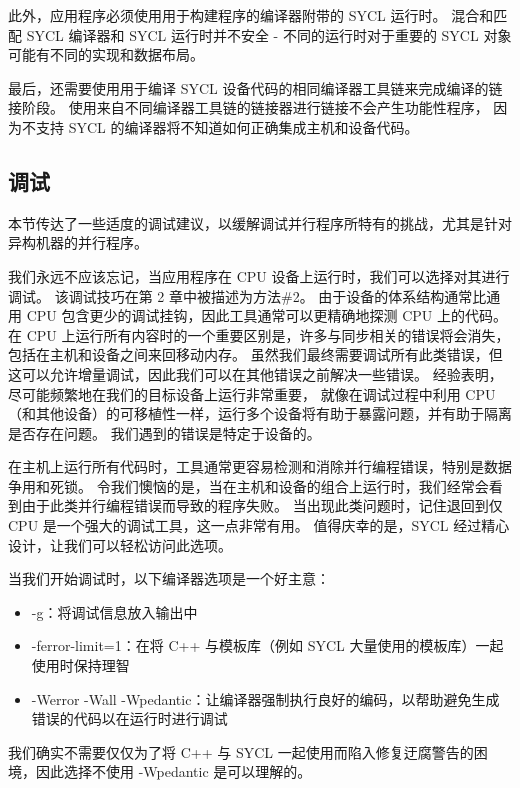 此外，应用程序必须使用用于构建程序的编译器附带的 SYCL 运行时。 
混合和匹配 SYCL 编译器和 SYCL 运行时并不安全 - 不同的运行时对于重要的 SYCL 对象可能有不同的实现和数据布局。

最后，还需要使用用于编译 SYCL 设备代码的相同编译器工具链来完成编译的链接阶段。 
使用来自不同编译器工具链的链接器进行链接不会产生功能性程序，
因为不支持 SYCL 的编译器将不知道如何正确集成主机和设备代码。

\subsection{调试}
本节传达了一些适度的调试建议，以缓解调试并行程序所特有的挑战，尤其是针对异构机器的并行程序。

我们永远不应该忘记，当应用程序在 CPU 设备上运行时，我们可以选择对其进行调试。 
该调试技巧在第 2 章中被描述为方法\#2。
由于设备的体系结构通常比通用 CPU 包含更少的调试挂钩，因此工具通常可以更精确地探测 CPU 上的代码。 
在 CPU 上运行所有内容时的一个重要区别是，许多与同步相关的错误将会消失，包括在主机和设备之间来回移动内存。 
虽然我们最终需要调试所有此类错误，但这可以允许增量调试，因此我们可以在其他错误之前解决一些错误。 
经验表明，尽可能频繁地在我们的目标设备上运行非常重要，
就像在调试过程中利用 CPU（和其他设备）的可移植性一样，运行多个设备将有助于暴露问题，并有助于隔离是否存在问题。 
我们遇到的错误是特定于设备的。

在主机上运行所有代码时，工具通常更容易检测和消除并行编程错误，特别是数据争用和死锁。 
令我们懊恼的是，当在主机和设备的组合上运行时，我们经常会看到由于此类并行编程错误而导致的程序失败。 
当出现此类问题时，记住退回到仅 CPU 是一个强大的调试工具，这一点非常有用。 
值得庆幸的是，SYCL 经过精心设计，让我们可以轻松访问此选项。

当我们开始调试时，以下编译器选项是一个好主意：

\begin{itemize}
	\item -g：将调试信息放入输出中

	\item -ferror-limit=1：在将 C++ 与模板库（例如 SYCL 大量使用的模板库）一起使用时保持理智

	\item -Werror -Wall -Wpedantic：让编译器强制执行良好的编码，以帮助避免生成错误的代码以在运行时进行调试
\end{itemize}

我们确实不需要仅仅为了将 C++ 与 SYCL 一起使用而陷入修复迂腐警告的困境，因此选择不使用 -Wpedantic 是可以理解的。

